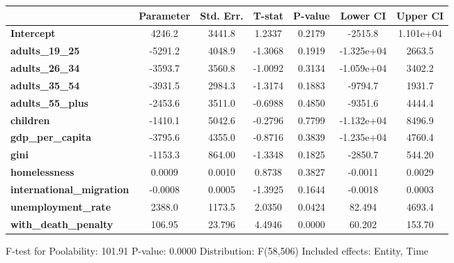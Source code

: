\begin{center}
\begin{tabular}{lclc}
\bottomrule
\end{tabular}
\begin{tabular}{lcccccc}
                                  & \textbf{Parameter} & \textbf{Std. Err.} & \textbf{T-stat} & \textbf{P-value} & \textbf{Lower CI} & \textbf{Upper CI}  \\
\midrule
\textbf{Intercept}                &       4246.2       &       3441.8       &      1.2337     &      0.2179      &      -2515.8      &     1.101e+04      \\
\textbf{adults\_19\_25}           &      -5291.2       &       4048.9       &     -1.3068     &      0.1919      &     -1.325e+04    &       2663.5       \\
\textbf{adults\_26\_34}           &      -3593.7       &       3560.8       &     -1.0092     &      0.3134      &     -1.059e+04    &       3402.2       \\
\textbf{adults\_35\_54}           &      -3931.5       &       2984.3       &     -1.3174     &      0.1883      &      -9794.7      &       1931.7       \\
\textbf{adults\_55\_plus}         &      -2453.6       &       3511.0       &     -0.6988     &      0.4850      &      -9351.6      &       4444.4       \\
\textbf{children}                 &      -1410.1       &       5042.6       &     -0.2796     &      0.7799      &     -1.132e+04    &       8496.9       \\
\textbf{gdp\_per\_capita}         &      -3795.6       &       4355.0       &     -0.8716     &      0.3839      &     -1.235e+04    &       4760.4       \\
\textbf{gini}                     &      -1153.3       &       864.00       &     -1.3348     &      0.1825      &      -2850.7      &       544.20       \\
\textbf{homelessness}             &       0.0009       &       0.0010       &      0.8738     &      0.3827      &      -0.0011      &       0.0029       \\
\textbf{international\_migration} &      -0.0008       &       0.0005       &     -1.3925     &      0.1644      &      -0.0018      &       0.0003       \\
\textbf{unemployment\_rate}       &       2388.0       &       1173.5       &      2.0350     &      0.0424      &       82.494      &       4693.4       \\
\textbf{with\_death\_penalty}     &       106.95       &       23.796       &      4.4946     &      0.0000      &       60.202      &       153.70       \\
\bottomrule
\end{tabular}
\end{center}

F-test for Poolability: 101.91 \newline
 P-value: 0.0000 \newline
 Distribution: F(58,506) \newline
  \newline
 Included effects: Entity, Time
